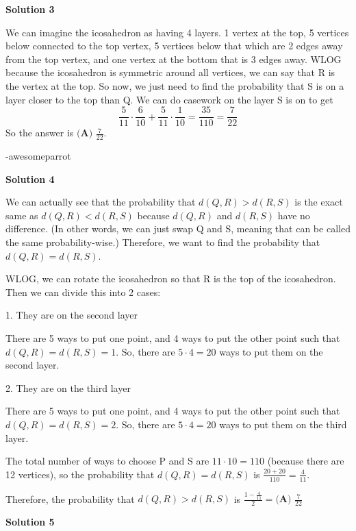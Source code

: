 \begin{enumerate}
 



\textbf{Solution 3}

We can imagine the icosahedron as having 4 layers. 1 vertex at the top, 5 vertices below connected to the top vertex, 5 vertices below that which are 2 edges away from the top vertex, and one vertex at the bottom that is 3 edges away. WLOG because the icosahedron is symmetric around all vertices, we can say that R is the vertex at the top. So now, we just need to find the probability that S is on a layer closer to the top than Q. We can do casework on the layer S is on to get 
 \[\frac{5}{11} \cdot \frac{6}{10} + \frac{5}{11} \cdot \frac{1}{10} = \frac{35}{110} = \frac{7}{22}\]So the answer is $\boxed{\textbf{(A) }\frac{7}{22}}$. 

 -awesomeparrot

 



\textbf{Solution 4}

We can actually see that the probability that $d(Q, R) > d(R, S)$ is the exact same as $d(Q, R) < d(R, S)$ because $d(Q, R)$ and $d(R, S)$ have no difference. (In other words, we can just swap Q and S, meaning that can be called the same probability-wise.) Therefore, we want to find the probability that $d(Q, R) = d(R, S)$.

 WLOG, we can rotate the icosahedron so that R is the top of the icosahedron. Then we can divide this into 2 cases:

 1. They are on the second layer

 There are 5 ways to put one point, and 4 ways to put the other point such that $d(Q, R) = d(R, S) = 1$. So, there are $5 \cdot 4 = 20$ ways to put them on the second layer.

 2. They are on the third layer

 There are 5 ways to put one point, and 4 ways to put the other point such that $d(Q, R) = d(R, S) = 2$. So, there are $5 \cdot 4 = 20$ ways to put them on the third layer.

 The total number of ways to choose P and S are $11 \cdot 10 = 110$ (because there are 12 vertices), so the probability that $d(Q, R) = d(R, S)$ is $\frac{20+20}{110} = \frac{4}{11}$.

 Therefore, the probability that $d(Q, R) > d(R, S)$ is $\frac{1 - \frac{4}{11}}{2} = \boxed{\textbf{(A) }\frac{7}{22}}$




\textbf{Solution 5}


\end{enumerate}
